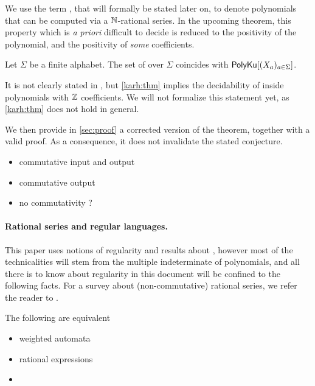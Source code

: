\documentclass[sigconf,natbib=false,screen, review,anonymous]{acmart}
\begin{document}
We use the term , that will formally be
stated later on, to denote polynomials that can be computed via a
$\mathbb{N}$-rational series. In the upcoming theorem, this property
which is \emph{a priori} difficult to decide is reduced to 
the positivity of the polynomial, and the positivity of \emph{some}
coefficients. 


\begin{faketheorem} 
    \label{karh:thm}
    Let $\Sigma$ be a finite alphabet.
    The set of  over $\Sigma$
    coincides with $\mathsf{PolyKu}[(X_a)_{a \in \Sigma}]$.
\end{faketheorem}

It is not clearly stated in \cite{KARH77}, but \cref{karh:thm} implies the
decidability of  inside polynomials with $\mathbb{Z}$
coefficients. We will not formalize this statement yet, as \cref{karh:thm} does
not hold in general.


We then provide in \cref{sec:proof} a
corrected version of the theorem, together with a valid proof. As a
consequence, it does not invalidate the stated conjecture.

\begin{itemize}
    \item commutative input and output
    \item commutative output
    \item no commutativity ?
\end{itemize}

\AP \paragraph*{Rational series and regular languages.} This paper uses notions
of regularity and results about , however most of
the technicalities will stem from the multiple indeterminate of polynomials,
and all there is to know about regularity in this document will be confined to
the following facts. For a survey about (non-commutative) rational series, we
refer the reader to \cite{berstel2011noncommutative}. 

\begin{definition}
    The following are equivalent
    \begin{itemize}
        \item weighted automata
        \item rational expressions
        \item 
    \end{itemize}
\end{definition}
\end{document}
